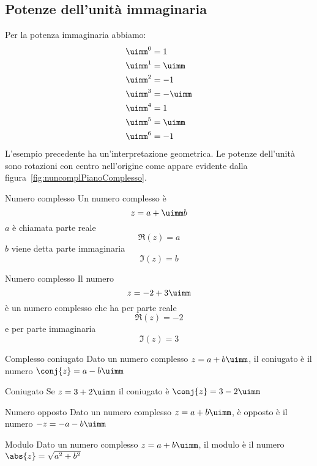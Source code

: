 \subsection{Potenze dell'unità immaginaria}
Per la potenza immaginaria abbiamo:
\begin{align*}
	&\uimm^0=1\\
	&\uimm^1=\uimm\\
	&\uimm^2=-1\\
	&\uimm^3=-\uimm\\
	&\uimm^4=1\\
	&\uimm^5=\uimm\\
	&\uimm^6=-1
\end{align*}
L'esempio precedente ha un'interpretazione geometrica. Le potenze dell'unità sono rotazioni  con  centro nell'origine come appare evidente dalla figura~\vref{fig:nuncomplPianoComplesso}.
\begin{definizionet}{Numero complesso}{}
	 Un numero complesso è \[z=a+\uimm b\] $a$ è chiamata parte reale \[\Re\left(z\right)=a\]
	$b$ viene detta  parte immaginaria\[\Im\left(z\right)=b \] 
\end{definizionet}
\begin{esempiot}{Numero complesso}{}
Il numero \[z=-2+3\uimm \] è un numero complesso che ha per parte reale \[\Re(z)=-2\]  e per parte immaginaria \[\Im(z)=3\]
\end{esempiot}
\begin{definizionet}{Complesso coniugato}{}
	Dato un numero complesso $z=a+b\uimm$, il coniugato è  il numero $\conj{z}=a-b\uimm$
\end{definizionet}
\begin{esempiot}{Coniugato}{}
Se $z=3+2\uimm$ il coniugato è $\conj{z}=3-2\uimm$ 
\end{esempiot}
\begin{definizionet}{Numero opposto}{}
Dato un numero complesso $z=a+b\uimm$, è opposto è il numero $-z=-a-b\uimm$
\end{definizionet}
\begin{definizionet}{Modulo}{}
Dato un numero  complesso $z=a+b\uimm$, il modulo è il numero $\abs{z}=\sqrt{a^2+b^2}$
\end{definizionet}
